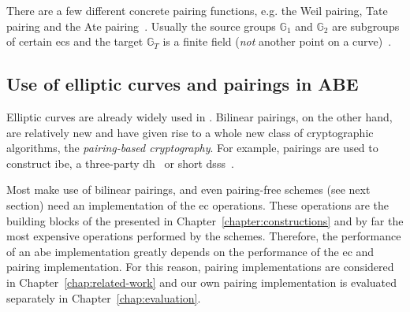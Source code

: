 There are a few different concrete pairing functions, e.g. the Weil pairing, Tate pairing and the Ate pairing~\cite{kiraz_still_2016}.
Usually the source groups $\mathbb{G}_1$ and $\mathbb{G}_2$ are subgroups of certain \glspl{ec} \cite{kiraz_still_2016} and the target $\mathbb{G}_T$ is a finite field (\emph{not} another point on a curve)~\cite{blake_advances_2005}.

\subsection{Use of elliptic curves and pairings in ABE}
Elliptic curves are already widely used in .
Bilinear pairings, on the other hand, are relatively new and have given rise to a whole new class of cryptographic algorithms, the \emph{pairing-based cryptography}.
For example, pairings are used to construct \gls{ibe}, a three-party \gls{dh}~\cite{joux_one_2000} or short \glspl{dss}~\cite{boneh_short_2001}.

Most  make use of bilinear pairings, and even pairing-free schemes (see next section) need an implementation of the \gls{ec} operations.
These operations are the building blocks of the  presented in Chapter~\ref{chapter:constructions} and by far the most expensive operations performed by the schemes.
Therefore, the performance of an \acrshort{abe} implementation greatly depends on the performance of the \gls{ec} and pairing implementation.
For this reason, pairing implementations are considered in Chapter~\ref{chap:related-work} and our own pairing implementation is evaluated separately in Chapter~\ref{chap:evaluation}.